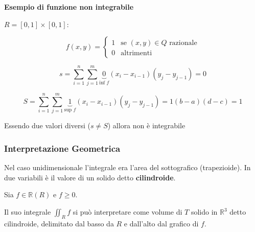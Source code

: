 \documentclass[../appunti-analisi.tex]{subfiles}
\begin{document}

\textbf{Esempio di funzione non integrabile} 

$R = [0,1] \times [0,1]$:

\[
    f(x,y) = \begin{cases}
        1 & \text{se $(x,y) \in Q$ razionale} \\
         0& \text{altrimenti}
    \end{cases}
\]

\[
    s = \sum^{n}_{i=1} \sum^{m}_{j=1} \underbrace{0}_\text{inf $f$} (x_i - x_{i-1})(y_j - y_{j-1}) = 0
\]


\[
    S = \sum^{n}_{i=1} \sum^{m}_{j=1} \underbrace{1}_\text{sup $f$} (x_i - x_{i-1})(y_j - y_{j-1}) = 1 (b-a) (d-c) = 1
\]

Essendo due valori diversi ($s \neq S$) allora non è integrabile

\subsubsection{Interpretazione Geometrica}

Nel caso unidimensionale l'integrale era l'area del sottografico (trapezioide). In due variabili è il valore di un solido detto \textbf{cilindroide}.

Sia $f \in \mathbb{R}(R)$ e $f \ge 0$.

Il suo integrale $\iint_R {f}$ si può interpretare come volume di $T$ solido in $\mathbb{R}^{3}$ detto cilindroide, delimitato dal basso da $R$ e dall'alto dal grafico di $f$.
\end{document}
